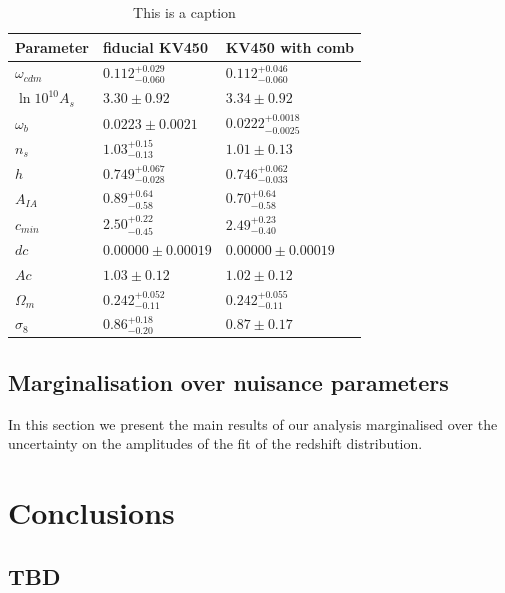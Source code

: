 \documentclass{aa}
\begin{document}
\begin{table}
\begin{tabular}{lll}
\hline
\hline
Parameter & fiducial KV450 & KV450 with comb\\
\hline
$\omega_{cdm }  $ & $0.112^{+0.029}_{-0.060}   $& $0.112^{+0.046}_{-0.060}   $\\

$\ln10^{10}A_{s }$ & $3.30\pm 0.92              $& $3.34\pm 0.92              $\\

$\omega_{b }    $ & $0.0223\pm 0.0021          $& $0.0222^{+0.0018}_{-0.0025}$\\

$n_{s }         $ & $1.03^{+0.15}_{-0.13}      $& $1.01\pm 0.13              $\\

$h              $ & $0.749^{+0.067}_{-0.028}   $& $0.746^{+0.062}_{-0.033}   $\\
\hline
$A_{IA }        $ & $0.89^{+0.64}_{-0.58}      $& $0.70^{+0.64}_{-0.58}              $\\

$c_{min }       $ & $2.50^{+0.22}_{-0.45}      $& $2.49^{+0.23}_{-0.40}     $\\

$dc             $ & $0.00000\pm 0.00019        $& $0.00000\pm 0.00019        $\\

$Ac             $ & $1.03\pm 0.12              $& $1.02\pm 0.12              $\\

$\Omega_{m }    $ & $0.242^{+0.052}_{-0.11}    $& $0.242^{+0.055}_{-0.11}    $\\

$\sigma_8        $ & $0.86^{+0.18}_{-0.20}      $& $0.87\pm 0.17      $\\
\hline
\end{tabular}
\caption{{\color{red} This is a caption}}
\label{tab:consistency}
\end{table}
\subsection{Marginalisation over nuisance parameters} 
In this section we present the main results of our analysis marginalised over the uncertainty on the amplitudes of the fit of the redshift distribution.

\section{Conclusions}

  
\begin{acknowledgements}
  
\end{acknowledgements}






\begin{appendix} 

\section{TBD}


\end{appendix}
%
%
\end{document}
